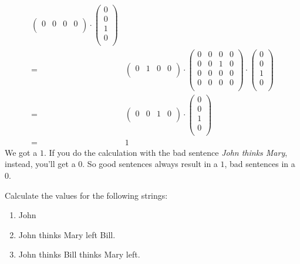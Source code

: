 \begin{align*}
\begin{pmatrix}
            0 & 0 & 0 & 0\\
        \end{pmatrix}
        \cdot
        \begin{pmatrix}
            0\\
            0\\
            1\\
            0\\
        \end{pmatrix}
        \\
    = & 
        \begin{pmatrix}
            0 & 1 & 0 & 0\\
        \end{pmatrix}
        \cdot
        \begin{pmatrix}
            0 & 0 & 0 & 0\\
            0 & 0 & 1 & 0\\
            0 & 0 & 0 & 0\\
            0 & 0 & 0 & 0\\
        \end{pmatrix}
        \cdot
        \begin{pmatrix}
            0\\
            0\\
            1\\
            0\\
        \end{pmatrix}
        \\
    = & 
        \begin{pmatrix}
            0 & 0 & 1 & 0\\
        \end{pmatrix}
        \cdot
        \begin{pmatrix}
            0\\
            0\\
            1\\
            0\\
        \end{pmatrix}
        \\
    = & 1
\end{align*}
%
We got a $1$.
If you do the calculation with the bad sentence \emph{John thinks Mary}, instead, you'll get a $0$.
So good sentences always result in a $1$, bad sentences in a $0$.

\medskip
\begin{homework}
    Calculate the values for the following strings:
    \begin{enumerate}
        \item John
        \item John thinks Mary left Bill.
        \item John thinks Bill thinks Mary left.
    \end{enumerate}
\end{homework}

